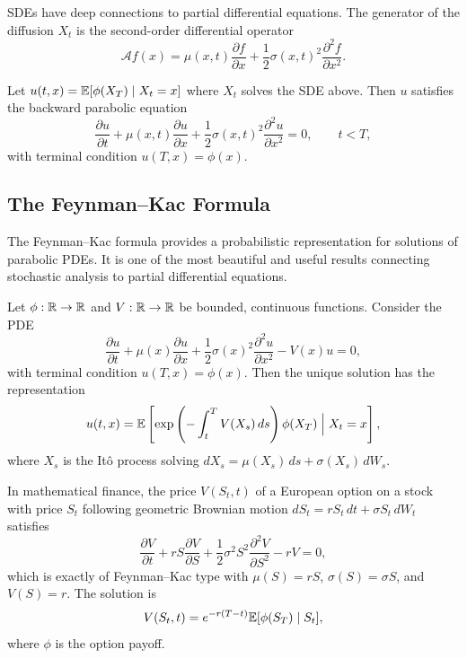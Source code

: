 SDEs have deep connections to partial differential equations. The generator of the diffusion \(X_t\) is the second-order differential operator
\[
\mathcal{A} f(x) = \mu(x,t) \frac{\partial f}{\partial x} + \frac12 \sigma(x,t)^2 \frac{\partial^2 f}{\partial x^2}.
\]

\begin{theorem}
Let \(u(t,x) = \mathbb{E}[\phi(X_T) \mid X_t = x]\) where \(X_t\) solves the SDE above. Then \(u\) satisfies the backward parabolic equation
\[
\frac{\partial u}{\partial t} + \mu(x,t) \frac{\partial u}{\partial x} + \frac12 \sigma(x,t)^2 \frac{\partial^2 u}{\partial x^2} = 0, \qquad t < T,
\]
with terminal condition \(u(T,x) = \phi(x)\).
\end{theorem}

\subsection{The Feynman--Kac Formula}

The Feynman--Kac formula provides a probabilistic representation for solutions of parabolic PDEs. It is one of the most beautiful and useful results connecting stochastic analysis to partial differential equations.

\begin{theorem}
Let \(\phi: \mathbb{R} \to \mathbb{R}\) and \(V: \mathbb{R} \to \mathbb{R}\) be bounded, continuous functions. Consider the PDE
\[
\frac{\partial u}{\partial t} + \mu(x) \frac{\partial u}{\partial x} + \frac12 \sigma(x)^2 \frac{\partial^2 u}{\partial x^2} - V(x) u = 0,
\]
with terminal condition \(u(T,x) = \phi(x)\). Then the unique solution has the representation
\[
u(t,x) = \mathbb{E}\left[ \exp\left(-\int_t^T V(X_s)\,ds\right) \phi(X_T) \;\Big|\; X_t = x \right],
\]
where \(X_s\) is the It\^{o} process solving \(dX_s = \mu(X_s)\,ds + \sigma(X_s)\,dW_s\).
\end{theorem}

\begin{example}
In mathematical finance, the price \(V(S_t, t)\) of a European option on a stock with price \(S_t\) following geometric Brownian motion \(dS_t = rS_t\,dt + \sigma S_t\,dW_t\) satisfies
\[
\frac{\partial V}{\partial t} + rS \frac{\partial V}{\partial S} + \frac12 \sigma^2 S^2 \frac{\partial^2 V}{\partial S^2} - rV = 0,
\]
which is exactly of Feynman--Kac type with \(\mu(S) = rS\), \(\sigma(S) = \sigma S\), and \(V(S) = r\). The solution is
\[
V(S_t, t) = e^{-r(T-t)} \mathbb{E}[\phi(S_T) \mid S_t],
\]
where \(\phi\) is the option payoff.
\end{example}

